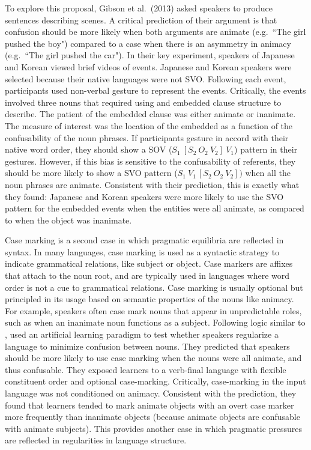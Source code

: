 \documentclass[man, noapacite, 12pt]{apa2}
\begin{document}
To explore this proposal, Gibson et al.\ (2013) asked speakers to produce sentences describing scenes. A critical prediction of their argument is that confusion should be more likely when both arguments are animate (e.g.\ ``The girl pushed the boy") compared to a case when there is an asymmetry in animacy (e.g.\ ``The girl pushed the car"). In their key experiment, speakers of Japanese and Korean viewed brief videos of events. Japanese and Korean speakers were selected because their native languages were not SVO. Following each event, participants used non-verbal  gesture to represent the events. Critically, the events  involved three nouns that required using and embedded clause structure to describe.  The patient of the embedded clause was either animate or inanimate. The measure of interest was the location of the embedded as a function of the confusability of the  noun phrases. If participants gesture in accord with their native word order, they should show a SOV ($S_{1}\  [S_{2}\ O_{2}\ V_{2}]\  V_{1}$) pattern in their gestures. However, if this bias is sensitive to the confusability of  referents, they should be more likely to show a SVO pattern ($S_{1}\  V_{1\ }[S_{2}\ O_{2}\ V_{2}])$ when all the noun phrases are animate. Consistent with their prediction, this is exactly what they found: Japanese and Korean speakers were more likely to use the SVO pattern for the embedded events when the entities were all animate, as compared to when the object was inanimate.

Case marking is a second case in which pragmatic equilibria are reflected in syntax. In many languages, case marking is used as a syntactic strategy to indicate  grammatical relations, like subject or object. Case markers are affixes that attach to the noun root, and are typically used in languages where word order is not a cue to grammatical relations. Case marking is usually optional but principled in its usage based on semantic properties of the nouns like animacy. For example, speakers often case mark nouns that appear in unpredictable roles, such as when an inanimate noun functions as a subject. Following logic similar to  ,   used an artificial learning paradigm to test whether speakers regularize a language to minimize confusion between nouns. They predicted that speakers should be more likely to use case marking when the nouns were all animate, and thus confusable. They exposed learners to a verb-final language with flexible constituent order and optional case-marking. Critically, case-marking in the input language was not conditioned on animacy. Consistent with the prediction, they found that learners tended to mark animate objects with an overt case marker more frequently than inanimate objects (because animate objects are confusable  with animate subjects). This provides another case in which pragmatic pressures are reflected in  regularities in language structure.
\end{document}
